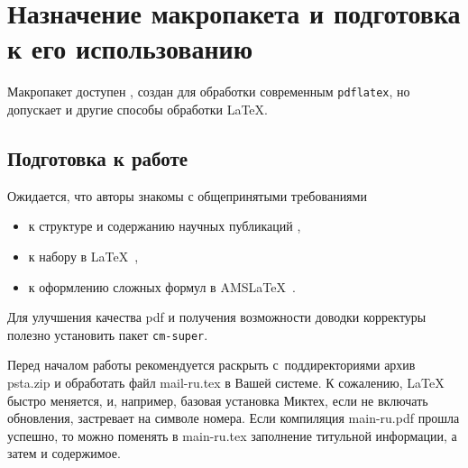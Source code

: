 \documentclass{psta}%
\begin{document}
\section{Назначение макропакета и подготовка к его использованию}\label{sec:general}
Макропакет доступен , создан для обработки современным \texttt{pdflatex}, но допускает и другие способы обработки LaTeX.

\subsection{Подготовка к работе}
Ожидается, что авторы знакомы с общепринятыми требованиями
\begin{itemize}
\item к структуре и содержанию научных публикаций \cites{Safonov2007,Fradkov2003,Sviderskaya2011,KirillovaLong,KirillovaShort},
\item к набору в \LaTeX\ \cites{Stolarov,Vorontsov,Syutkin},
\item к оформлению сложных формул в  AMS\LaTeX\ \cites{AMSshort,Mathmode}.
\end{itemize}

Для улучшения качества pdf и получения возможности доводки корректуры полезно установить пакет \verb|cm-super|.

Перед началом работы рекомендуется раскрыть с~поддиректориями архив psta.zip %
и обработать файл \textsf{mail-ru.tex} в Вашей системе. К сожалению, LaTeX быстро меняется, и, например, базовая установка Миктех, если не включать обновления, застревает на символе номера.
Если компиляция \textsf{main-ru.pdf} прошла успешно, то можно поменять в \textsf{main-ru.tex} заполнение титульной информации, а затем и содержимое.
\end{document}
